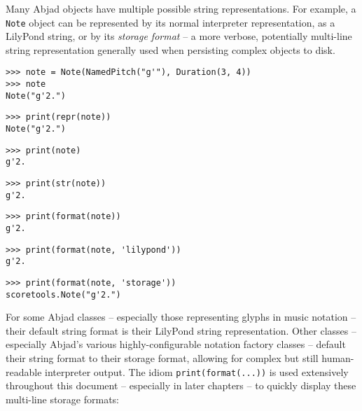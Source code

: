 \noindent Many Abjad objects have multiple possible string representations. For
example, a \texttt{Note} object can be represented by its normal interpreter
representation, as a LilyPond string, or by its \emph{storage format} -- a more
verbose, potentially multi-line string representation generally used when
persisting complex objects to disk.

\begin{comment}
<abjad>
note = Note(NamedPitch("g'"), Duration(3, 4))
note
print(repr(note))
print(note)
print(str(note))
print(format(note))
print(format(note, 'lilypond'))
print(format(note, 'storage'))
</abjad>
\end{comment}

\begin{abjadbookoutput}
\begin{singlespacing}
\vspace{-0.5\baselineskip}
\begin{verbatim}
>>> note = Note(NamedPitch("g'"), Duration(3, 4))
>>> note
Note("g'2.")
\end{verbatim}
\begin{verbatim}
>>> print(repr(note))
Note("g'2.")
\end{verbatim}
\begin{verbatim}
>>> print(note)
g'2.
\end{verbatim}
\begin{verbatim}
>>> print(str(note))
g'2.
\end{verbatim}
\begin{verbatim}
>>> print(format(note))
g'2.
\end{verbatim}
\begin{verbatim}
>>> print(format(note, 'lilypond'))
g'2.
\end{verbatim}
\begin{verbatim}
>>> print(format(note, 'storage'))
scoretools.Note("g'2.")
\end{verbatim}
\end{singlespacing}
\end{abjadbookoutput}

\noindent For some Abjad classes -- especially those representing glyphs in
music notation -- their default string format is their LilyPond string
representation. Other classes -- especially Abjad's various highly-configurable
notation factory classes -- default their string format to their storage
format, allowing for complex but still human-readable interpreter output. The
idiom \texttt{print(format(...))} is used extensively throughout
this document -- especially in later chapters -- to quickly display these
multi-line storage formats:

